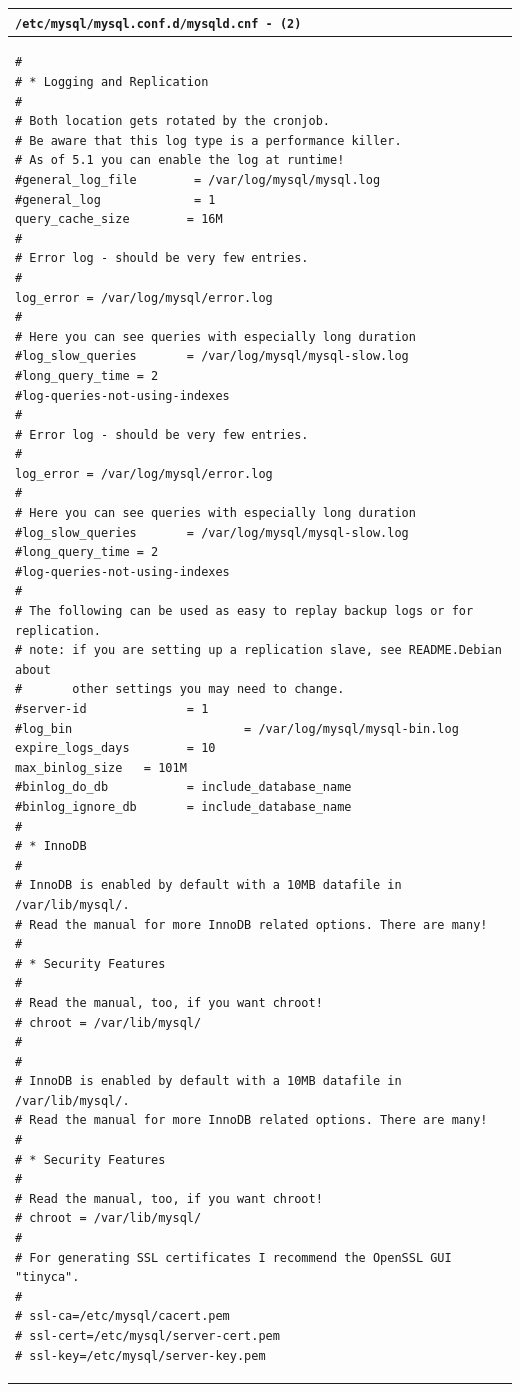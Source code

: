 \documentclass[11pt]{article}
\begin{document}
\begin{table}[ht]
    \begin{tabular}{|p{17.7cm}|} 
        \hline
    \texttt{\textbf{/etc/mysql/mysql.conf.d/mysqld.cnf} - (\texttt{2})}\\ 
        \hline
        \lstset{
                basicstyle=\scriptsize\ttfamily,
        }
            \begin{lstlisting}
#
# * Logging and Replication
#
# Both location gets rotated by the cronjob.
# Be aware that this log type is a performance killer.
# As of 5.1 you can enable the log at runtime!
#general_log_file        = /var/log/mysql/mysql.log
#general_log             = 1
query_cache_size        = 16M               
#
# Error log - should be very few entries.
#
log_error = /var/log/mysql/error.log
#
# Here you can see queries with especially long duration
#log_slow_queries       = /var/log/mysql/mysql-slow.log
#long_query_time = 2
#log-queries-not-using-indexes
#
# Error log - should be very few entries.
#
log_error = /var/log/mysql/error.log
#
# Here you can see queries with especially long duration
#log_slow_queries       = /var/log/mysql/mysql-slow.log
#long_query_time = 2
#log-queries-not-using-indexes
#
# The following can be used as easy to replay backup logs or for replication.
# note: if you are setting up a replication slave, see README.Debian about
#       other settings you may need to change.
#server-id              = 1
#log_bin                        = /var/log/mysql/mysql-bin.log
expire_logs_days        = 10
max_binlog_size   = 101M
#binlog_do_db           = include_database_name
#binlog_ignore_db       = include_database_name
#
# * InnoDB
#
# InnoDB is enabled by default with a 10MB datafile in /var/lib/mysql/.
# Read the manual for more InnoDB related options. There are many!
#
# * Security Features
#
# Read the manual, too, if you want chroot!
# chroot = /var/lib/mysql/
#
#
# InnoDB is enabled by default with a 10MB datafile in /var/lib/mysql/.
# Read the manual for more InnoDB related options. There are many!
#
# * Security Features
#
# Read the manual, too, if you want chroot!
# chroot = /var/lib/mysql/
#
# For generating SSL certificates I recommend the OpenSSL GUI "tinyca".
#
# ssl-ca=/etc/mysql/cacert.pem
# ssl-cert=/etc/mysql/server-cert.pem
# ssl-key=/etc/mysql/server-key.pem               
            \end{lstlisting}\\
        \hline
    \end{tabular}
\end{table}
\end{document}
